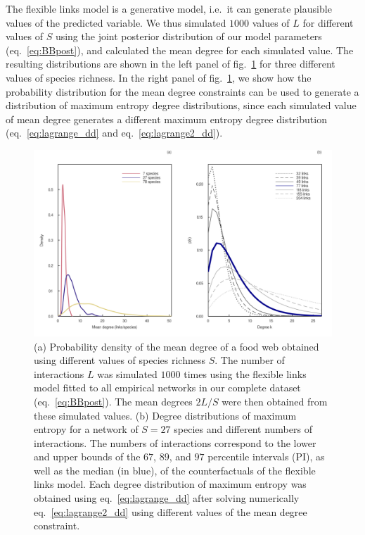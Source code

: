 \documentclass[11pt]{article}
\makeatletter
\def\maxwidth{\ifdim\Gin@nat@width>\linewidth\linewidth
\else\Gin@nat@width\fi}
\let\Oldincludegraphics\includegraphics
\renewcommand{\includegraphics}[1]{\Oldincludegraphics[width=\maxwidth]{#1}}
\makeatother
\begin{document}
The flexible links model is a generative model, i.e.~it can generate
plausible values of the predicted variable. We thus simulated \(1000\)
values of \(L\) for different values of \(S\) using the joint posterior
distribution of our model parameters (eq.~\ref{eq:BBpost}), and
calculated the mean degree for each simulated value. The resulting
distributions are shown in the left panel of
fig.~\ref{fig:degree_dist_fl} for three different values of species
richness. In the right panel of fig.~\ref{fig:degree_dist_fl}, we show
how the probability distribution for the mean degree constraints can be
used to generate a distribution of maximum entropy degree distributions,
since each simulated value of mean degree generates a different maximum
entropy degree distribution (eq.~\ref{eq:lagrange_dd} and
eq.~\ref{eq:lagrange2_dd}).

\begin{figure}
\hypertarget{fig:degree_dist_fl}{%
\centering
\includegraphics{figures/maxent_degree_dist_fl.png}
\caption{(a) Probability density of the mean degree of a food web
obtained using different values of species richness \(S\). The number of
interactions \(L\) was simulated \(1000\) times using the flexible links
model fitted to all empirical networks in our complete dataset
(eq.~\ref{eq:BBpost}). The mean degrees \(2L/S\) were then obtained from
these simulated values. (b) Degree distributions of maximum entropy for
a network of \(S=27\) species and different numbers of interactions. The
numbers of interactions correspond to the lower and upper bounds of the
\(67%
\), \(89%
\), and \(97%
\) percentile intervals (PI), as well as the median (in blue), of the
counterfactuals of the flexible links model. Each degree distribution of
maximum entropy was obtained using eq.~\ref{eq:lagrange_dd} after
solving numerically eq.~\ref{eq:lagrange2_dd} using different values of
the mean degree constraint.}\label{fig:degree_dist_fl}
}
\end{figure}
\end{document}
